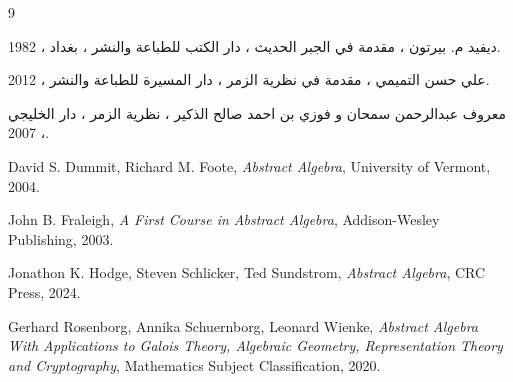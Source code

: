 \begin{thebibliography}{9}
	
	ديفيد م. بيرتون ، مقدمة في الجبر الحديث ، دار الكتب للطباعة والنشر ، بغداد ، 1982.
	
	علي حسن التميمي ، مقدمة في نظرية الزمر ، دار المسيرة للطباعة والنشر ، 2012.
	
	معروف عبدالرحمن سمحان و فوزي بن احمد صالح الذكير ، نظرية الزمر ، دار الخليجي ، 2007.
	
	\begin{otherlanguage}{english}
		
		David S. Dummit, Richard M. Foote,
		\textit{Abstract Algebra},
		University of Vermont, 2004.
		
		John B. Fraleigh,
		\textit{A First Course in Abstract Algebra},
		Addison-Wesley Publishing, 2003.
		
		Jonathon K. Hodge, Steven Schlicker, Ted Sundstrom,
		\textit{Abstract Algebra},
		CRC Press, 2024.
		
		Gerhard Rosenborg, Annika Schuernborg, Leonard Wienke,
		\textit{Abstract Algebra With Applications to Galois Theory, Algebraic Geometry, Representation Theory and Cryptography},
		Mathematics Subject Classification, 2020.
		
	\end{otherlanguage}
	
\end{thebibliography}